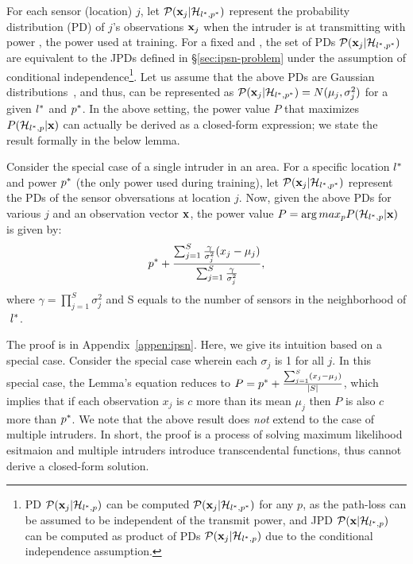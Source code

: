 For each sensor (location) $j$, let $\mathcal{P}(\mathbf{x}_j | \mathcal{H}_{l^*,p^*})$ represent the
probability distribution (PD) of $j$'s observations $\mathbf{x}_j$ when the
intruder is at \lstar transmitting with power \pstar, the power used
at training.
For a fixed \lstar and \pstar, the set of PDs $\mathcal{P}(\mathbf{x}_j | \mathcal{H}_{l^*,p^*})$ are
equivalent to the JPDs defined in \S\ref{sec:ipsn-problem} under the
assumption of conditional independence\footnote{PD $\mathcal{P}(\mathbf{x}_j |
  \mathcal{H}_{l^*,p})$ can be computed $\mathcal{P}(\mathbf{x}_j | \mathcal{H}_{l^*,p^*})$ for any $p$, as the
  path-loss can be assumed to be independent of the transmit power,
  and JPD $\mathcal{P}(\mathbf{x} | \mathcal{H}_{l^*,p})$ can be computed as product of PDs
  $\mathcal{P}(\mathbf{x}_j | \mathcal{H}_{l^*,p})$ due to the conditional independence assumption.}.
Let us assume that the above PDs are Gaussian
distributions~\cite{gauss}, and thus, can be represented as $\mathcal{P}(\mathbf{x}_j
| \mathcal{H}_{l^*,p^*}) = N(\mu_j, \sigma_j^2)$ for a given $l^*$ and $p^*$.
In the above setting, the power value $P$ that maximizes $P(\mathcal{H}_{l^*,p} | \mathbf{x})$
can actually be derived as a closed-form expression; we state the result
formally in the below lemma. 
\begin{lemma-wo-prf}
  Consider the special case of a single intruder in an area.  For a
  specific location $l^*$ and power $p^*$ (the only power used
  during training), let $\mathcal{P}(\mathbf{x}_j | \mathcal{H}_{l^*,p^*})$ represent the PDs of the
  sensor obversations at location $j$. Now, given the above PDs for
  various $j$ and an observation vector $\mathbf{x}$, the power value
  $P = \arg max_p P(\mathcal{H}_{l^*,p} | \mathbf{x})$ is   given by: 
  $$p^* + \frac{\sum_{j=1}^{S} \frac{\gamma}{\sigma_j^2}(x_j - \mu_j)}{\sum_{j=1}^{S} \frac{\gamma}{\sigma_j^2}},$$
  where $\gamma = \prod_{j=1}^{S} \sigma_j^2$ and S equals to the number of sensors in the neighborhood of  $\ l^*$.
  \label{lem:p}
\end{lemma-wo-prf}
The proof is in Appendix~\ref{appen:ipsn}. 
Here, we give its intuition based on a special case. 
Consider the special case wherein each $\sigma_j$ is 1 for all
$j$. In this special case, the Lemma's equation reduces to $P = p^*
+ \frac{\sum_{j=1}^{S}(x_j - \mu_j)}{|S|}$, which implies that if each
observation $x_j$ is $c$ more than its mean $\mu_j$ then $P$ is also
$c$ more than $p^*$. We note that the above result does {\em not}
extend to the case of multiple intruders. In short, the proof is a process of solving maximum likelihood esitmaion and multiple intruders introduce transcendental functions, thus cannot derive a closed-form solution.

